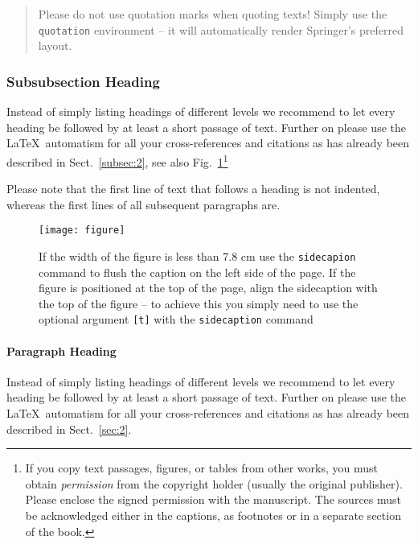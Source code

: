 \documentclass[graybox]{svmult}
\begin{document}
\begin{quotation}
Please do not use quotation marks when quoting texts! Simply use the \verb|quotation| environment -- it will automatically render Springer's preferred layout.
\end{quotation}


\subsubsection{Subsubsection Heading}
Instead of simply listing headings of different levels we recommend to
let every heading be followed by at least a short passage of text.
Further on please use the \LaTeX\ automatism for all your
cross-references and citations as has already been described in
Sect.~\ref{subsec:2}, see also Fig.~\ref{fig:1}\footnote{If you copy
text passages, figures, or tables from other works, you must obtain
\textit{permission} from the copyright holder (usually the original
publisher). Please enclose the signed permission with the manuscript. The
sources must be acknowledged either in the
captions, as footnotes or in a separate section of the book.}

Please note that the first line of text that follows a heading is not indented, whereas the first lines of all subsequent paragraphs are.

%
\begin{figure}[b]
\sidecaption
\texttt{[image: figure]}
%
%
\caption{If the width of the figure is less than 7.8 cm use the \texttt{sidecapion} command to flush the caption on the left side of the page. If the figure is positioned at the top of the page, align the sidecaption with the top of the figure -- to achieve this you simply need to use the optional argument \texttt{[t]} with the \texttt{sidecaption} command}
\label{fig:1}       %
\end{figure}


\paragraph{Paragraph Heading} %
Instead of simply listing headings of different levels we recommend to
let every heading be followed by at least a short passage of text.
Further on please use the \LaTeX\ automatism for all your
cross-references and citations as has already been described in
Sect.~\ref{sec:2}.
\end{document}
